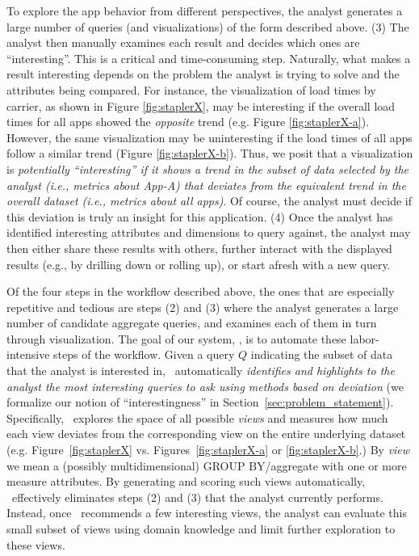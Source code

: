 To explore the app behavior from different perspectives, the analyst generates
a large number of queries (and visualizations) of the form described above.
(3) The analyst then manually examines each result and decides
which ones are ``interesting''. This is a critical and time-consuming step.
Naturally, what makes a result interesting depends on the 
problem the analyst is trying to solve and the
attributes being compared.
For instance, the visualization of load times by carrier, as shown in Figure
\ref{fig:staplerX}, may be interesting if the overall load times for all
apps showed the {\it opposite} trend (e.g. Figure \ref{fig:staplerX-a}).
However, the same visualization may be uninteresting if the load times of all apps
follow a similar trend (Figure \ref{fig:staplerX-b}).
Thus, we posit that  a visualization is {\em potentially ``interesting'' if it shows 
a trend in the subset of data selected by the analyst
(i.e., metrics about App-A)
that deviates from the equivalent trend in the overall dataset (i.e., metrics
about all apps)}.
Of course, the analyst must decide if this deviation 
is truly an insight for this application.
(4) Once the analyst has identified interesting attributes and dimensions to query
against, the analyst may
then either share these results with others, further interact with
the displayed results (e.g., by drilling down or rolling up), or
start afresh with a new query.


Of the four steps in the workflow described above, the 
ones that are especially repetitive and tedious are steps (2) and (3)
where the analyst generates a large number of candidate aggregate queries, 
and examines each
of them in turn through visualization.
The goal of our system, \VizRecDB, is to automate these
labor-intensive steps of the workflow. 
Given a query $Q$ indicating the subset
of data that the analyst is interested in, \VizRecDB\ automatically {\em
identifies and highlights to the analyst the most interesting queries to ask using methods based on
deviation} (we formalize our notion of ``interestingness'' in Section~\ref{sec:problem_statement}).
Specifically, \VizRecDB\ explores the space of all possible {\it views} and
measures how much each view deviates from the corresponding view on the
entire underlying dataset (e.g. Figure~\ref{fig:staplerX} vs.
Figures~\ref{fig:staplerX-a} or \ref{fig:staplerX-b}.) 
By {\it view} we mean a (possibly multidimensional) GROUP BY/aggregate with one or more
measure attributes.
By generating and
scoring such views automatically, \VizRecDB\ effectively eliminates
steps (2) and (3) that the analyst currently performs. 
Instead, once \VizRecDB\
recommends a few interesting views, the analyst can evaluate this small
subset of views using domain knowledge and limit further
exploration to these views.  

